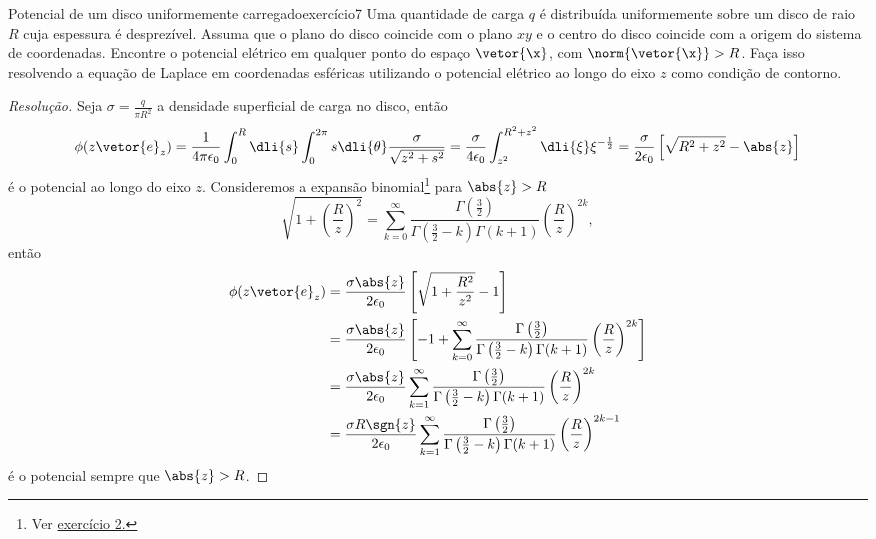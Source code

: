 \begin{exercício}{Potencial de um disco uniformemente carregado}{exercício7}
    Uma quantidade de carga \(q\) é distribuída uniformemente sobre um disco de raio \(R\) cuja espessura é desprezível. Assuma que o plano do disco coincide com o plano \(xy\) e o centro do disco coincide com a origem do sistema de coordenadas. Encontre o potencial elétrico em qualquer ponto do espaço \(\vetor{\x}\), com \(\norm{\vetor{\x}} > R\). Faça isso resolvendo a equação de Laplace em coordenadas esféricas utilizando o potencial elétrico ao longo do eixo \(z\) como condição de contorno.
\end{exercício}
\begin{proof}[Resolução]
    Seja \(\sigma = \frac{q}{\pi R^2}\) a densidade superficial de carga no disco, então
    \begin{equation*}
        \phi(z\vetor{e}_z) = \frac{1}{4\pi \epsilon_0} \int_0^R \dli{s}\int_0^{2\pi} s\dli{\theta}\frac{\sigma}{\sqrt{z^2 + s^2}} = \frac{\sigma}{4 \epsilon_0} \int_{z^2}^{R^2 + z^2} \dli{\xi} \xi^{-\frac12} =\frac{\sigma}{2 \epsilon_0} \left[\sqrt{R^2 + z^2} - \abs{z}\right]
    \end{equation*}
    é o potencial ao longo do eixo \(z\). Consideremos a expansão binomial\footnote{Ver \href{https://github.com/louisradial/4302307-fismat-ii/blob/main/lista de exercícios 2/lista2.pdf}{exercício 2.}} para \(\abs{z} > R\)
    \begin{equation*}
        \sqrt{1 + \left(\frac{R}{z}\right)^2} = \sum_{k=0}^\infty \frac{\Gamma\left(\frac32\right)}{\Gamma\left(\frac32- k\right)\Gamma(k+1)}\left(\frac{R}{z}\right)^{2k},
    \end{equation*}
    então
    \begin{align*}
        \phi(z \vetor{e}_z) &=\frac{\sigma \abs{z}}{2 \epsilon_0}\left[\sqrt{1 + \frac{R^2}{z^2}} - 1\right]\\
                            &= \frac{\sigma \abs{z}}{2 \epsilon_0}\left[-1 + \sum_{k=0}^\infty \frac{\Gamma\left(\frac32\right)}{\Gamma\left(\frac32- k\right)\Gamma(k+1)}\left(\frac{R}{z}\right)^{2k}\right]\\
                            &= \frac{\sigma \abs{z}}{2 \epsilon_0}\sum_{k = 1}^\infty \frac{\Gamma\left(\frac32\right)}{\Gamma\left(\frac32 - k\right) \Gamma(k + 1)}\left(\frac{R}{z}\right)^{2k}\\
                            &= \frac{\sigma R \sgn{z}}{2 \epsilon_0} \sum_{k = 1}^\infty \frac{\Gamma\left(\frac32\right)}{\Gamma\left(\frac32 - k\right) \Gamma(k + 1)}\left(\frac{R}{z}\right)^{2k-1}
    \end{align*}
    é o potencial sempre que \(\abs{z} > R\).


\end{proof}

